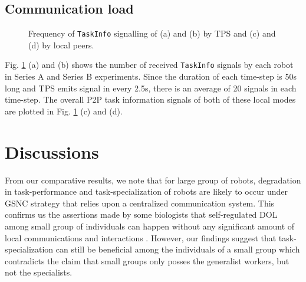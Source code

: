 \documentclass[journal]{IEEEtran}
\begin{document}
\subsection{Communication load}
\begin{figure}
\centering
{}
\newline
{}
\newline
{}
\newline
{}
\newline
\caption{Frequency of \texttt{TaskInfo} signalling of (a) and (b) by TPS and (c) and (d) by local peers.}
\label{fig:signal-frequency-stat}
\end{figure}
Fig. \ref{fig:signal-frequency-stat} (a) and (b) shows the number of received \texttt{TaskInfo} signals by each robot in Series A and Series B experiments. Since the duration of each time-step is 50s long and TPS emits signal in every 2.5s, there is an average of 20 signals in each time-step. The overall P2P task information signals of both of these local modes are plotted in Fig. \ref{fig:signal-frequency-stat} (c) and (d).
\section{Discussions}
\label{sec:discuss}
From our comparative results, we note that for large group of robots,  degradation in  task-performance and task-specialization of robots are likely to occur  under GSNC strategy that relies upon a centralized communication system. This confirms us the assertions made by some biologists that self-regulated DOL among small group of individuals can happen without any significant amount of local communications and interactions \cite{Garnier+2007}. However, our findings suggest that task-specialization can still be beneficial among the individuals of a small group which contradicts the claim that small groups only posses the generalist workers, but not the specialists.
\end{document}
